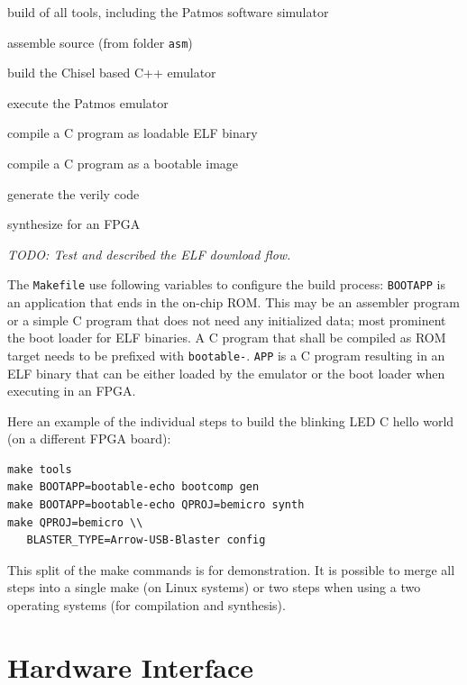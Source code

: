 \documentclass{IEEEtran}
\newcommand{\code}[1]{{\texttt{#1}}}
\newcommand{\todo}[1]{{\emph{TODO: #1}}}
\begin{document}
\begin{description}[\settowidth{\labelwidth}{emulator}]
\item[tools] build of all tools, including the Patmos software simulator
\item[asm] assemble source (from folder \code{asm})
\item[emulator] build the Chisel based C++ emulator
\item[csim] execute the Patmos emulator 
\item[comp] compile a C program as loadable ELF binary
\item[bootcomp] compile a C program as a bootable image
\item[gen] generate the verily code
\item[synth] synthesize for an FPGA
\end{description}


\todo{Test and described the ELF download flow.}

The \code{Makefile} use following variables to configure the build process:
\code{BOOTAPP} is an application that ends in the on-chip ROM. This may
be an assembler program or a simple C program that does not need any
initialized data; most prominent the boot loader for ELF binaries.
A C program that shall be compiled as ROM target needs to be prefixed
with \code{bootable-}.
\code{APP} is a C program resulting in an ELF binary that can be either
loaded by the emulator or the boot loader when executing in an FPGA.

Here an example of the individual steps to build the blinking LED C
hello world (on a different FPGA board):
\begin{verbatim}
make tools
make BOOTAPP=bootable-echo bootcomp gen
make BOOTAPP=bootable-echo QPROJ=bemicro synth
make QPROJ=bemicro \\
   BLASTER_TYPE=Arrow-USB-Blaster config
\end{verbatim}

This split of the make commands is for demonstration. It is
possible to merge all steps into a single make (on Linux
systems) or two steps when using a two operating
systems (for compilation and synthesis).

\section{Hardware Interface}
\end{document}
